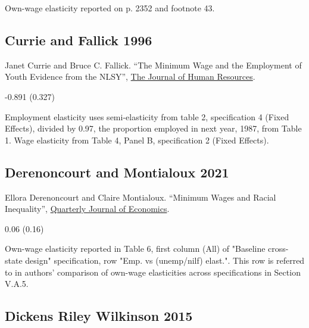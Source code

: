 \vspace{0.7em}

 Own-wage elasticity reported on p. 2352 and footnote 43.

\subsection*{Currie and Fallick 1996}
\vspace{-0.7em}

\noindent Janet Currie and Bruce C. Fallick. ``The Minimum Wage and the Employment of Youth Evidence from the NLSY'', \href{https://doi.org/10.2307/146069}{The Journal of Human Resources}.

\vspace{0.7em}

 -0.891 (0.327)

\vspace{0.7em}

 Employment elasticity uses semi-elasticity from table 2, specification 4 (Fixed Effects), divided by 0.97, the proportion employed in next year, 1987, from Table 1. Wage elasticity from Table 4, Panel B, specification 2 (Fixed Effects).

\subsection*{Derenoncourt and Montialoux 2021}
\vspace{-0.7em}

\noindent Ellora Derenoncourt and Claire Montialoux. ``Minimum Wages and Racial Inequality'', \href{https://doi.org/10.1093/qje/qjaa031}{Quarterly Journal of Economics}.

\vspace{0.7em}

 0.06 (0.16)

\vspace{0.7em}

 Own-wage elasticity reported in Table 6, first column (All) of "Baseline cross-state design" specification, row "Emp. vs (unemp/nilf) elast.". This row is referred to in authors' comparison of own-wage elasticities across specifications in Section V.A.5.

\subsection*{Dickens Riley Wilkinson 2015}
\vspace{-0.7em}

